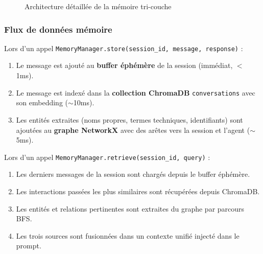 \documentclass[12pt, a4paper]{article}
\begin{document}
\begin{figure}[H]
\caption{Architecture détaillée de la mémoire tri-couche}
\label{fig:memory_detail}
\end{figure}

\subsubsection{Flux de données mémoire}

Lors d'un appel \texttt{MemoryManager.store(session\_id, message, response)} :

\begin{enumerate}
  \item Le message est ajouté au \textbf{buffer éphémère} de la session (immédiat, $<$1ms).
  \item Le message est indexé dans la \textbf{collection ChromaDB} \texttt{conversations} avec son embedding ($\sim$10ms).
  \item Les entités extraites (noms propres, termes techniques, identifiants) sont ajoutées au \textbf{graphe NetworkX} avec des arêtes vers la session et l'agent ($\sim$5ms).
\end{enumerate}

Lors d'un appel \texttt{MemoryManager.retrieve(session\_id, query)} :
\begin{enumerate}
  \item Les derniers messages de la session sont chargés depuis le buffer éphémère.
  \item Les interactions passées les plus similaires sont récupérées depuis ChromaDB.
  \item Les entités et relations pertinentes sont extraites du graphe par parcours BFS.
  \item Les trois sources sont fusionnées dans un contexte unifié injecté dans le prompt.
\end{enumerate}
\end{document}
